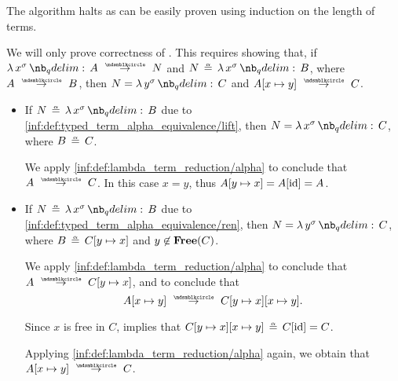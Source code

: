 \begin{defproof}
  The algorithm halts as can be easily proven using induction on the length of terms.

  We will only prove correctness of . This requires showing that, if \( \qabs {x^\sigma} A \pred N \) and \( N \aequiv \qabs {x^\sigma} B \), where \( A \pred B \), then \( N = \qabs {y^\sigma} C \) and \( A[x \mapsto y] \pred C \).

  \begin{itemize}
    \item If \( N \aequiv \qabs {x^\sigma} B \) due to \ref{inf:def:typed_term_alpha_equivalence/lift}, then \( N = \qabs {x^\sigma} C \), where \( B \aequiv C \).

    We apply \ref{inf:def:lambda_term_reduction/alpha} to conclude that \( A \pred C \). In this case \( x = y \), thus \( A[y \mapsto x] = A[\operatorname{id}] = A \).

    \item If \( N \aequiv \qabs {x^\sigma} B \) due to \ref{inf:def:typed_term_alpha_equivalence/ren}, then \( N = \qabs {y^\sigma} C \), where \( B \aequiv C[y \mapsto x] \) and \( y \not\in \op*{Free}(C) \).

    We apply \ref{inf:def:lambda_term_reduction/alpha} to conclude that \( A \pred C[y \mapsto x] \), and  to conclude that
    \begin{equation*}
      A[x \mapsto y] \pred C[y \mapsto x][x \mapsto y].
    \end{equation*}

    Since \( x \) is free in \( C \),  implies that \( C[y \mapsto x][x \mapsto y] \aequiv C[\id] = C \).

    Applying \ref{inf:def:lambda_term_reduction/alpha} again, we obtain that \( A[x \mapsto y] \pred C \).
  \end{itemize}
\end{defproof}

